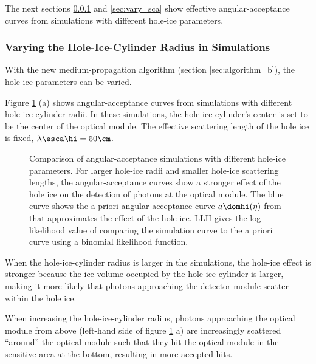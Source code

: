 The next sections \ref{sec:vary_radius} and \ref{sec:vary_sca} show effective angular-acceptance curves from simulations with different hole-ice parameters.


\subsubsection{Varying the Hole-Ice-Cylinder Radius in Simulations}
\label{sec:vary_radius}

With the new medium-propagation algorithm (section \ref{sec:algorithm_b}), the hole-ice parameters can be varied.


Figure \ref{fig:neiyi3Al} (a) shows angular-acceptance curves from simulations with different hole-ice-cylinder radii. In these simulations, the hole-ice cylinder's center is set to be the center of the optical module. The effective scattering length of the hole ice is fixed, $\lambda\esca\hi = 50\cm$.

\begin{figure}[htbp]
  \hfill
  \hfill
  \caption{Comparison of angular-acceptance simulations with different hole-ice parameters. For larger hole-ice radii and smaller hole-ice scattering lengths, the angular-acceptance curves show a stronger effect of the hole ice on the detection of photons at the optical module. The blue curve shows the a priori angular-acceptance curve $a\domhi(\eta)$ from \cite{icepaper} that approximates the effect of the hole ice. LLH gives the log-likelihood value of comparing the simulation curve to the a priori curve using a binomial likelihood function.}
  \label{fig:neiyi3Al}
\end{figure}

When the hole-ice-cylinder radius is larger in the simulations, the hole-ice effect is stronger because the ice volume occupied by the hole-ice cylinder is larger, making it more likely that photons approaching the detector module scatter within the hole ice.

When increasing the hole-ice-cylinder radius, photons approaching the optical module from above (left-hand side of figure \ref{fig:neiyi3Al} a) are increasingly scattered ``around'' the optical module such that they hit the optical module in the sensitive area at the bottom, resulting in more accepted hits.

